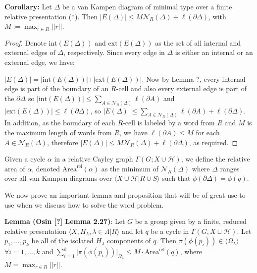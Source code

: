 \documentclass[12pt]{article}
\newcommand{\vs}{\vskip10pt}
\begin{document}
	\vs
	
	\textbf{Corollary: } Let $\Delta$ be a van Kampen diagram of minimal type over a finite relative presentation (*). Then $\vert E(\Delta) \vert\leq M \mathcal{N}_R(\Delta) + \ell(\partial \Delta)$, with $M := \max_{r \in R} \vert \vert r \vert \vert$. 
	
	\begin{proof}
		
		Denote $\text{int}(E(\Delta))$ and $\text{ext}(E(\Delta))$ as the set of all internal and external edges of $\Delta$, respectively. Since every edge in $\Delta$ is either an internal or an external edge, we have: 
		
		\vs
		
		$\vert E(\Delta) \vert = \vert \text{int}(E(\Delta)) \vert + \vert \text{ext}(E(\Delta)) \vert$. Now by Lemma ?, every internal edge is part of the boundary of an $R$-cell and also every external edge is part of the $\partial \Delta$ so $\vert \text{int}(E(\Delta)) \vert \leq \sum_{A \in \mathcal{N}_R(\Delta)} \ell(\partial A)$ and $\vert \text{ext}(E(\Delta)) \vert \leq \ell(\partial \Delta)$, so $\vert E(\Delta) \vert \leq \sum_{A \in \mathcal{N}_R(\Delta)} \ell(\partial A) + \ell(\partial \Delta)$. In addition, as the boundary of each $R$-cell is labeled by a word from $R$ and $M$ is the maximum length of words from $R$, we have $\ell(\partial A) \leq M$ for each $A \in \mathcal{N}_R(\Delta)$, therefore $\vert E(\Delta) \vert \leq M \mathcal{N}_R(\Delta) + \ell(\partial \Delta)$, as required. 
		
	\end{proof}
	
	\vs
	
	Given a cycle $\alpha$ in a relative Cayley graph $\Gamma(G; X \cup \mathcal{H})$, we define the relative area of $\alpha$, denoted $\text{Area}^{\text{rel}} (\alpha)$ as the minimum of $\mathcal{N}_R(\Delta)$ where $\Delta$ ranges over all van Kampen diagrams over $\langle X \cup \mathcal{H} \vert R \cup S \rangle$ such that $\phi(\partial \Delta) = \phi(q)$. 
	
	\vs 
	
	We now prove an important lemma and proposition that will be of great use to use when we discuss how to solve the word problem. 
	
	\vs 
	
	\textbf{Lemma (Osin [?] Lemma 2.27)}: Let $G$ be a group given by a finite, reduced relative presentation $\langle X, H_{\lambda}, \lambda \in \Lambda \vert R \rangle$ and let $q$ be a cycle in $\Gamma(G, X \sqcup \mathcal{H})$. Let $p_1,...,p_k$ be all of the isolated $H_{\lambda}$ components of $q$. Then $\pi(\phi(p_i)) \in \langle \Omega_{\lambda} \rangle$ $\forall i =1,...,k$ and $\sum_{i=1}^k \vert \pi(\phi(p_i)) \vert_{\Omega_{\lambda}} \leq M \cdot \text{Area}^{\text{rel}}(q)$, where $M = \max_{r \in R} \vert \vert r \vert \vert$.
	
\end{document}
